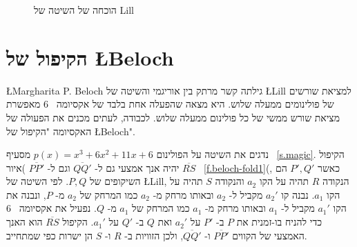 \begin{figure}[tb]
\begin{center}
\end{center}
\caption{הוכחה של השיטה של Lill}\label{f.lill-proof}
\end{figure}



\section{%
הקיפול של
\L{Beloch}}\label{s.beloch-fold}

\L{Margharita P. Beloch}
גילתה קשר מרתק בין אוריגמי והשיטה של
\L{Lill}
למציאת שורשים של פולינומים ממעלה שלוש. היא מצאה שהפעלה אחת בלבד של אקסיומה%
~$6$
מאפשרת מציאת שורש ממשי של כל פולינום ממעלה שלוש. לכבודה, לעתים מכנים את הפעולה של האקסיומה "הקיפול של
\L{Beloch}".

נדגים את השיטה על הפולינום
$p(x)=x^3+6x^2+11x+6$
מסעיף%
~\ref{s.magic}.
הקיפול
$\overline{RS}$
יהיה אנך אמצעי גם ל-%
$\overline{QQ'}$
וגם ל-%
$\overline{PP'}$
)איור~%
\ref{f.beloch-fold1}(,
כאשר 
$P',Q'$
הם השיקופים של
$P,Q$.
לפי השיטה של
\L{Lill},
הנקודה
$R$
תהיה על הקו
$a_2$
והנקודה
$S$
תהיה על הקו
$a_1$.
נבנה קו
$a_2'$
מקביל ל-%
$a_2$
ובאותו מרחק מ-%
$a_2$
כמו המרחק של
$a_2$
מ-%
$P$,
ונבנה את הקו
$a_1'$
מקביל ל-%
$a_1$
ובאותו מרחק מ-%
$a_1$
כמו המרחק של
$a_1$
מ-%
$Q$.
נפעיל את אקסיומה%
~$6$
כדי להניח בו-זמנית את 
$P$
ב-%
$P'$
על 
$a_2'$
ואת 
$Q$
ב-%
$Q'$
על
$a_1'$.
הקיפול 
$\overline{RS}$
הוא האנך האמצעי של הקווים
$\overline{PP'}$
ו-%
$\overline{QQ'}$,
ולכן הזוויות ב-%
$R$
ו-%
$S$
הן ישרות כפי שמתחייב.



